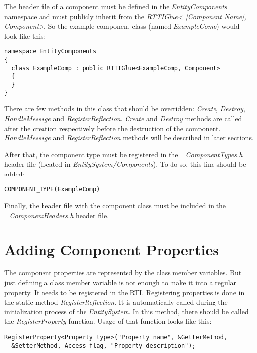 \documentclass[a4paper, 12pt]{report}
\begin{document}
The header file of a component must be defined in the \emph{EntityComponents} namespace and must publicly inherit from the  \emph{RTTIGlue< [Component Name], Component>}. So the example component class (named \emph{ExampleComp}) would look like this:

\footnotesize 
\begin{verbatim}
namespace EntityComponents
{
  class ExampleComp : public RTTIGlue<ExampleComp, Component>
  {
  }
}
\end{verbatim}
\normalsize

There are few methods in this class that should be overridden: \emph{Create}, \emph{Destroy}, \emph{HandleMessage} and \emph{RegisterReflection}. \emph{Create} and \emph{Destroy} methods are called after the creation respectively before the destruction of the component. \emph{HandleMessage} and \emph{RegisterReflection} methods will be described in later sections.

After that, the component type must be registered in the \emph{\_ComponentTypes.h} header file (located in \emph{EntitySystem/Components}). To do so, this line should be added:
\footnotesize 
\begin{verbatim}
COMPONENT_TYPE(ExampleComp)
\end{verbatim}
\normalsize

Finally, the header file with the component class must be included in the \emph{\_ComponentHeaders.h} header file.

\section{Adding Component Properties}

The component properties are represented by the class member variables. But just defining a class member variable is not enough to make it into a regular property. It needs to be registered in the RTI. Registering properties is done in the static method \emph{RegisterReflection}. It is automatically called during the initialization process of the \emph{EntitySystem}. In this method, there should be called the \emph{RegisterProperty} function. Usage of that function looks like this:

\footnotesize 
\begin{verbatim}
RegisterProperty<Property type>("Property name", &GetterMethod, 
  &SetterMethod, Access flag, "Property description");
\end{verbatim}
\normalsize
\end{document}
